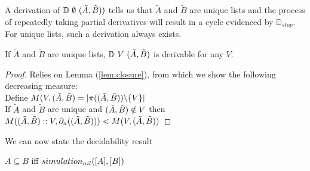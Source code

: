 \documentclass[a4paper,UKenglish,cleveref, autoref, thm-restate]{lipics-v2021}
\newcommand\mycomment[1]{}
\begin{document}
A derivation of $\mathbb{D}~\emptyset~(\tilde{A},\tilde{B}))$ tells us that $\tilde{A}$ and $\tilde{B}$ are unique lists and the process of repeatedly taking partial derivatives will result in a cycle evidenced by $\mathbb{D}_{stop}$. For unique lists, such a derivation always exists.
\begin{lemma}
If $\tilde{A}$ and $\tilde{B}$ are unique lists, $\mathbb{D}~{V}~(\tilde{A},\tilde{B})$ is derivable for any $V$.
\end{lemma}
\begin{proof}
Relies on Lemma (\ref{lem:closure}), from which we show the following decreasing measure:\\
Define $M(V,(\tilde{A},\tilde{B}) = |\pi((\tilde{A},\tilde{B})) \backslash \{V\}|  $ \mycomment{using set notation for lists}\\
If $\tilde{A}$ and $\tilde{B}$ are unique and $(\tilde{A},\tilde{B}) \notin V$ then $M((\tilde{A},\tilde{B})::V,\partial_{a}((\tilde{A},\tilde{B}))) <  M(V,(\tilde{A},\tilde{B})) $
\end{proof}
We can now state the decidability result
\begin{lemma}\label{lem:dec}
$A \subseteq B$ iff $\simulationb{nil}{[A]}{[B]}$
\end{lemma}
\end{document}
